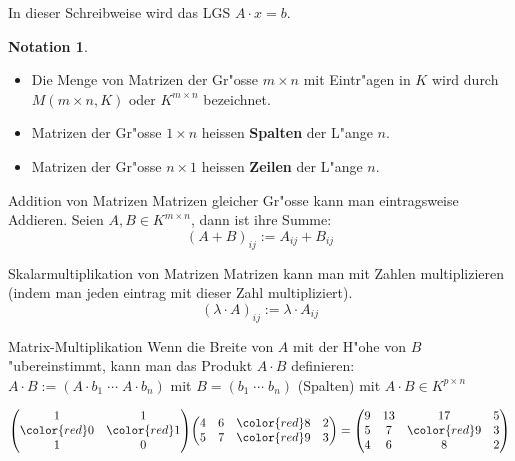 \documentclass[oneside,fontsize=11pt,paper=a4,BCOR=0mm,DIV=12,automark,headsepline]{scrbook}
\theoremstyle{remark}
\theoremstyle{definition}
\newtheorem*{notation}{Notation}
\theoremstyle{definition}
\theoremstyle{remark}
\begin{document}
\begin{exa}
  In dieser Schreibweise wird das LGS
  \(A\cdot x = b\).
\end{exa}
\begin{notation}$ $\newline
  \begin{itemize}
  \item Die Menge von Matrizen der Gr"osse \(m\times n\) mit Eintr"agen in \(K\) wird durch \(M(m\times n, K)\) oder \(K^{m\times n}\) bezeichnet. 
  \item Matrizen der Gr"osse \(1\times
    n\) heissen \textbf{Spalten} der L"ange \(n\). 
  \item Matrizen der Gr"osse \(n\times 1\) heissen
    \textbf{Zeilen} der L"ange \(n\).
  \end{itemize}
\end{notation}

\begin{definition}{Addition von Matrizen}{}
  Matrizen gleicher Gr"osse kann man eintragsweise Addieren. Seien \(A,B \in K^{m\times n}\), dann ist ihre Summe: \[(A+B)_{ij}:=A_{ij}+B_{ij}\]
\end{definition}

\begin{definition}{Skalarmultiplikation von Matrizen}{}
  Matrizen kann man mit Zahlen multiplizieren (indem man jeden eintrag mit dieser
  Zahl multipliziert).
  \[(\lambda \cdot A)_{ij}:=\lambda \cdot A_{ij}\]
\end{definition}

\begin{definition}{Matrix-Multiplikation}{}
  Wenn die Breite von \(A\) mit der H"ohe von \(B\) "ubereinstimmt, kann man das
  Produkt \(A\cdot B\) definieren: \\
  \(A\cdot B:=(A\cdot b_1\; \cdots \; A\cdot b_n)\) mit \(B=(b_1\; \cdots\; b_n)\) (Spalten)
  mit \(A\cdot B \in K^{p\times n}\)
\end{definition}
\begin{exa}
  \({\begin{pmatrix}1&1\\{\color {red}0}&{\color {red}1}\\1&0\end{pmatrix}}{\begin{pmatrix}4&6&{\color {red}8}&2\\5&7&{\color {red}9}&3\end{pmatrix}}={\begin{pmatrix}9&13&17&5\\5&7&{\color {red}9}&3\\4&6&8&2\end{pmatrix}}\)
\end{exa}
\end{document}
